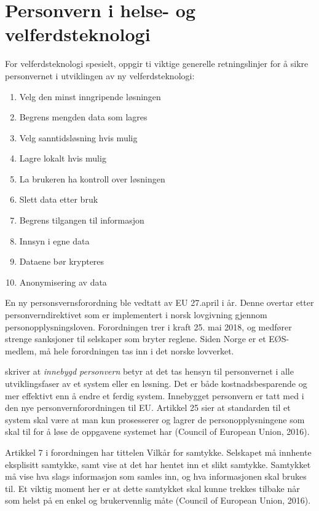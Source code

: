 \section{Personvern i helse- og velferdsteknologi}
For velferdsteknologi spesielt, oppgir \citet{datatilsynet_welfare} ti viktige generelle retningslinjer for å sikre personvernet
i utviklingen av ny velferdsteknologi:

\begin{enumerate}
    \item Velg den minst inngripende løsningen
    \item Begrens mengden data som lagres
    \item Velg sanntidsløsning hvis mulig
    \item Lagre lokalt hvis mulig
    \item La brukeren ha kontroll over løsningen
    \item Slett data etter bruk
    \item Begrens tilgangen til informasjon
    \item Innsyn i egne data
    \item Dataene bør krypteres
    \item Anonymisering av data
\end{enumerate}

En ny personsvernsforordning ble vedtatt av EU 27.april i år. Denne overtar
etter personverndirektivet som er implementert i norsk lovgivning gjennom
personopplysningsloven. Forordningen trer i kraft 25. mai 2018, og medfører
strenge sanksjoner til selskaper som bryter reglene. Siden Norge er et EØS-medlem,
må hele forordningen tas inn i det norske lovverket.

\citet{datatilsynet_privacy} skriver at \textit{innebygd personvern} betyr at det tas hensyn
til personvernet i alle utviklingsfaser av et system eller en løsning. Det er
både kostnadsbesparende og mer effektivt enn å endre et ferdig system. Innebygget
personvern er tatt med i den nye personvernforordningen til EU.
Artikkel 25 sier at standarden til et system skal være at man kun prosesserer
og lagrer de personopplysningene som skal til for å løse de oppgavene
systemet har (Council of European Union, 2016).

Artikkel 7 i forordningen har tittelen Vilkår for samtykke. Selskapet må
innhente eksplisitt samtykke, samt vise at det har hentet inn et slikt samtykke.
Samtykket må vise hva slags informasjon som samles inn, og hva informasjonen
skal brukes til. Et viktig moment her er at dette samtykket skal kunne
trekkes tilbake når som helst på en enkel og brukervennlig måte (Council of
European Union, 2016).

